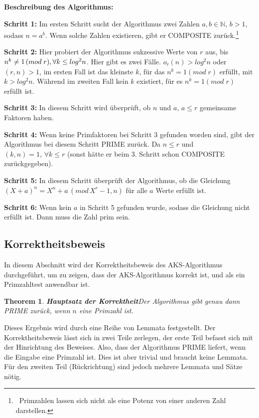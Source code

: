 \documentclass[12pt,oneside]{article}
\newtheorem{theorem}{Theorem}[section]
\theoremstyle{remark}
\theoremstyle{definition}
\begin{document}
\textbf{Beschreibung des Algorithmus:}\newline

\textbf{Schritt 1: }Im ersten Schritt sucht der Algorithmus zwei Zahlen $a,b \in \mathbb{N}, \, b > 1$, sodass $n = a^b$. Wenn solche Zahlen existieren, gibt er COMPOSITE zurück.\footnote{$\,$ Primzahlen lassen sich nicht als eine Potenz von einer anderen Zahl darstellen.}  

\textbf{Schritt 2: }Hier probiert der Algorithmus sukzessive Werte von $r$ aus, bis $n^k \neq 1 \, (mod \; r), \,\newline \forall k \leq log^2 n$. Hier gibt es zwei Fälle.  $o_r(n) > log^2 n$ oder $(r,n) > 1$, im ersten Fall ist das kleinste $k$, für das $n^k =  1 (mod \; r)$ erfüllt, mit $k > log^2n$. Während im zweiten Fall kein $k$ existiert, für es $n^k = 1 (mod \; r)$ erfüllt ist.  

\textbf{Schritt 3: }In diesem Schritt wird überprüft, ob $n$ und $a, \, a \leq r$ gemeinsame Faktoren haben. 

\textbf{Schritt 4: } Wenn keine Primfaktoren bei Schritt 3 gefunden worden sind, gibt der Algorithmus bei diesem Schritt PRIME zurück. Da $n \leq r$ und $(k,n) = 1, \, \forall k \leq r $ (sonst hätte er beim 3. Schritt schon COMPOSITE zurückgegeben).

\textbf{Schritt 5: } In diesem Schritt überprüft der Algorithmus, ob die Gleichung $(X+a)^n = X^n + a \, (mod \, X^r - 1,n)$ für alle $a$ Werte erfüllt ist.

\textbf{Schritt 6: } Wenn kein $a$ in Schritt 5 gefunden wurde, sodass die Gleichung nicht erfüllt ist. Dann muss die Zahl prim sein. 
\newpage

\subsection{Korrektheitsbeweis}

In diesem Abschnitt wird der Korrektheitsbeweis des AKS-Algorithmus durchgeführt, um zu zeigen, dass der AKS-Algorithmus korrekt ist, und als ein Primzahltest anwendbar ist.  

\begin{theorem}
\textbf{Hauptsatz der Korrektheit}\newline Der Algorithmus gibt genau dann PRIME zurück, wenn $n$ eine Primzahl ist.
\end{theorem}
Dieses Ergebnis wird durch eine Reihe von Lemmata festgestellt. Der Korrektheitsbeweis lässt sich in zwei Teile zerlegen, der erste Teil befasst sich mit der Hinrichtung des Beweises. Also, dass der Algorithmus PRIME liefert, wenn die Eingabe eine Primzahl ist. Dies ist aber trivial und braucht keine Lemmata. Für den zweiten Teil (Rückrichtung) sind jedoch mehrere Lemmata und Sätze nötig. 
\end{document}
